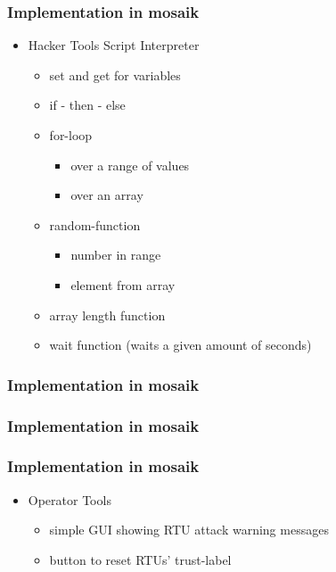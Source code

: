 \documentclass{beamer}
\begin{document}
\begin{frame}
	\frametitle{Implementation in mosaik}
	\begin{itemize}
		\item Hacker Tools Script Interpreter
			\begin{itemize}
				\item set and get for variables
				\item if - then - else
				\item for-loop
					\begin{itemize}
						\item over a range of values
						\item over an array
					\end{itemize}
				\item random-function
					\begin{itemize}
						\item number in range
						\item element from array
					\end{itemize}
				\item array length function
				\item wait function (waits a given amount of seconds)
			\end{itemize}
	\end{itemize}
\end{frame}

\begin{frame}
	\frametitle{Implementation in mosaik}
	
\end{frame}

\begin{frame}
	\frametitle{Implementation in mosaik}
	
\end{frame}

\begin{frame}
	\frametitle{Implementation in mosaik}
	\begin{itemize}
		\item Operator Tools
			\begin{itemize}
				\item simple GUI showing RTU attack warning messages
				\item button to reset RTUs' trust-label
			\end{itemize}
	\end{itemize}
\end{frame}
\end{document}
